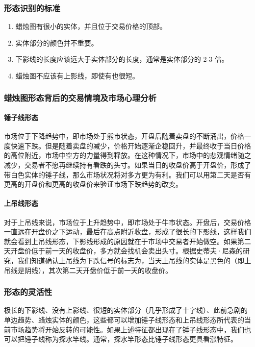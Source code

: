 \subsubsection*{形态识别的标准}
\begin{enumerate}
    \item 蜡烛图有很小的实体，并且位于交易价格的顶部。
    \item 实体部分的颜色并不重要。
    \item 下影线的长度应该远大于实体部分的长度，通常是实体部分的 2-3 倍。
    \item 蜡烛图不应该有上影线，即使有也很短。
\end{enumerate}
\subsubsection*{蜡烛图形态背后的交易情境及市场心理分析}
\paragraph{锤子线形态} 市场位于下降趋势中，即市场处于熊市状态，开盘后随着卖盘的不断涌出，价格一度快速下跌。但是随着卖盘的减少，价格开始逐渐企稳回升，并最终收于当日价格的高位附近，市场中空方的力量得到释放。在这种情况下，市场中的悲观情绪随之减少，交易者不愿再继续持有看跌的头寸。如果当日的收盘价高于开盘价，形成了带白色实体的锤子线，那么市场状况将对多方更为有利。我们可以用第二天是否有更高的开盘价和更高的收盘价来验证市场下跌趋势的改变。

\paragraph{上吊线形态}对于上吊线来说，市场位于上升趋势中，即市场处于牛市状态。开盘后，交易价格一直远在开盘价之下运动，最后在高点附近收盘，形成了很长的下影线，这样我们就会看到上吊线形态，下影线形成的原因就在于市场中交易者开始做空。如果第二天开盘价低于前一天的收盘价，多方就会找机会卖出头寸。根据史蒂夫·尼森的研究，我们知道确认上吊线为下跌信号的标志为，当天上吊线的实体是黑色的（即上吊线是阴线），其次第二天开盘价低于前一天的收盘价。
\subsubsection*{形态的灵活性}
极长的下影线、没有上影线、很短的实体部分（几乎形成了十字线）、此前急剧的单边趋势、蜡烛实体的颜色，这些都可以增加锤子线形态和上吊线形态所代表的当前市场趋势将开始反转的可能性。如果上述特征都出现在了锤子线形态中，我们也可以把锤子线称为探水竿线。通常，探水竿形态比锤子线形态更具看涨特征。

